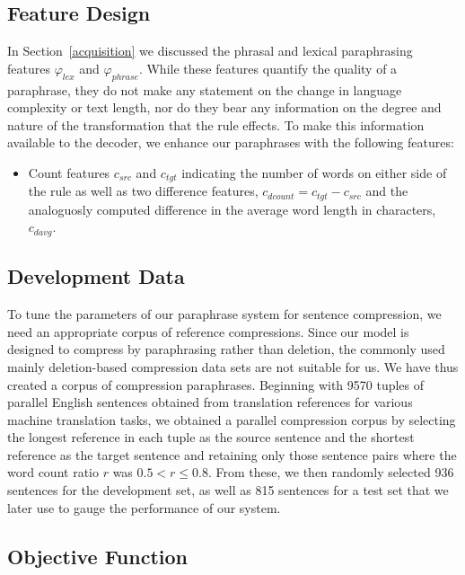 \documentclass[11pt]{article}
\begin{document}
\subsection{Feature Design}
In Section~\ref{acquisition} we discussed the phrasal and lexical
paraphrasing features $\varphi_{\mathit{lex}}$ and
$\varphi_{\mathit{phrase}}$. While these features quantify the quality
of a paraphrase, they do not make any statement on the change in
language complexity or text length, nor do they bear any information
on the degree and nature of the transformation that the rule
effects. To make this information available to the decoder, we enhance
our paraphrases with the following features:
\begin{itemize}
\item Count features $c_{\mathit{src}}$ and $c_{\mathit{tgt}}$
  indicating the number of words on either side of the rule as well as
  two difference features, $c_{\mathit{dcount}} = c_{\mathit{tgt}} -
  c_{\mathit{src}}$ and the analoguosly computed difference in the
  average word length in characters, $c_{\mathit{davg}}$.
\end{itemize}


\subsection{Development Data}
\label{dev-data-and-objective-functions}
To tune the parameters of our paraphrase system for sentence
compression, we need an appropriate corpus of reference
compressions. Since our model is designed to compress by paraphrasing
rather than deletion, the commonly used mainly deletion-based
compression data sets are not suitable for us. We have thus created a
corpus of compression paraphrases. Beginning with 9570 tuples of
parallel English sentences obtained from translation references for
various machine translation tasks, we obtained a parallel compression
corpus by selecting the longest reference in each tuple as the source
sentence and the shortest reference as the target sentence and
retaining only those sentence pairs where the word count ratio $r$ was
$0.5 < r \leq 0.8$. From these, we then randomly selected 936
sentences for the development set, as well as 815 sentences for a test
set that we later use to gauge the performance of our system.

\subsection{Objective Function}
\end{document}
